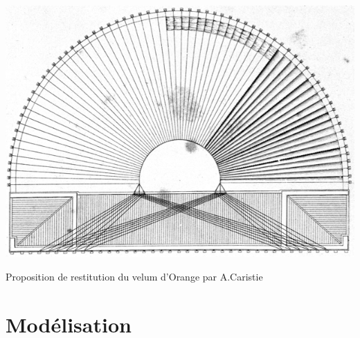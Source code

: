 \begin{figureth}
		\includegraphics[width=\linewidth]{images/velumCaristie}
		\caption[Velum]{Proposition de restitution du velum d'Orange par A.Caristie}
		\label{velumCaristie}
\end{figureth}		















	\chapter{Modélisation}
		\minitoc
		\newpage
		
